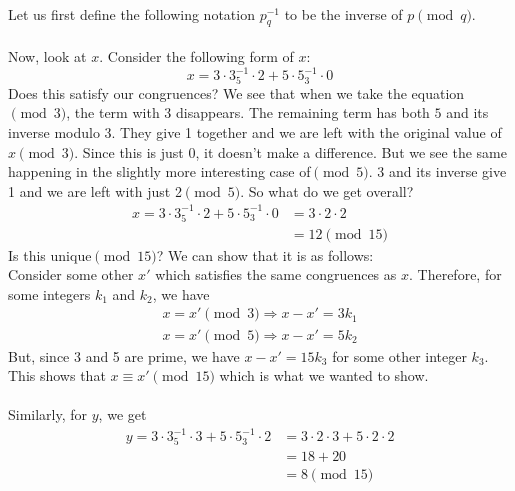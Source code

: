 \documentclass[]{article}
\begin{document}
\begin{qunlist}
{{\begin{enumerate}
      \\ Let us first define the following notation $p^{-1}_q$ to be the inverse of $p\pmod q$.
      \\\\ Now, look at $x$. Consider the following form of $x$:
      $$x = 3 \cdot 3^{-1}_5 \cdot 2 + 5 \cdot 5^{-1}_3 \cdot 0$$
      Does this satisfy our congruences? We see that when we take the equation$\pmod 3$, the term with 3 disappears. The remaining term has both $5$ and its inverse modulo 3. They give 1 together and we are left with the original value of $x\pmod 3$. Since this is just 0, it doesn't make a difference. But we see the same happening in the slightly more interesting case of$\pmod 5$. 3 and its inverse give 1 and we are left with just 2$\pmod 5$.
      \newpage
      So what do we get overall?
      \begin{align*}
	x = 3 \cdot 3^{-1}_5 \cdot 2 + 5 \cdot 5^{-1}_3 \cdot 0 &= 3 \cdot 2 \cdot 2 \\
	&= 12 \pmod {15}
      \end{align*}
      Is this unique$\pmod{15}$? We can show that it is as follows:\\
      Consider some other $x'$ which satisfies the same congruences as $x$. Therefore, for some integers $k_1$ and $k_2$, we have
      \begin{align*}
	x = x'\pmod 3 \Rightarrow x - x' = 3k_1\\
	x = x'\pmod 5 \Rightarrow x - x' = 5k_2
      \end{align*}
      But, since 3 and 5 are prime, we have $x - x' = 15k_3$ for some other integer $k_3$.
      \\This shows that $x \equiv x'\pmod{15}$ which is what we wanted to show.
      \\\\Similarly, for $y$, we get
      \begin{align*}
	y = 3 \cdot 3^{-1}_5 \cdot 3 + 5 \cdot 5^{-1}_3 \cdot 2 &= 3 \cdot 2 \cdot 3 + 5 \cdot 2 \cdot 2 \\
	&= 18 + 20 \\
	&= 8 \pmod{15} \\
      \end{align*}


\end{enumerate}}}
\end{qunlist}
\end{document}
